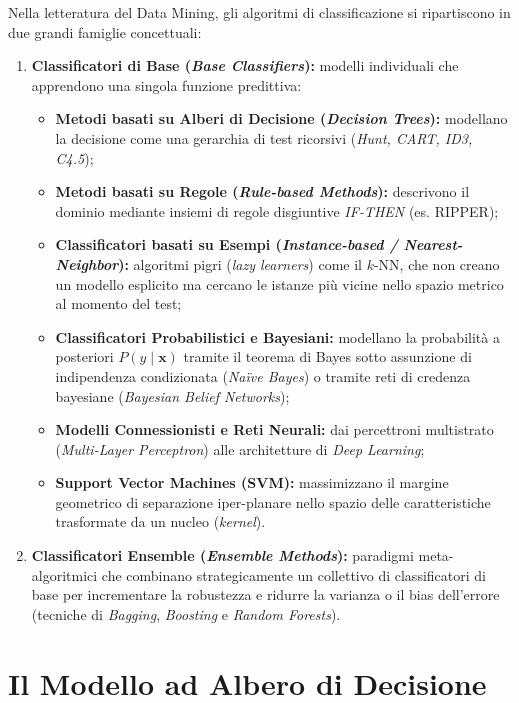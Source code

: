 Nella letteratura del Data Mining, gli algoritmi di classificazione si ripartiscono in due grandi famiglie concettuali:
\begin{enumerate}
    \item \textbf{Classificatori di Base (\textit{Base Classifiers}):} modelli individuali che apprendono una singola funzione predittiva:
    \begin{itemize}
        \item \textbf{Metodi basati su Alberi di Decisione (\textit{Decision Trees}):} modellano la decisione come una gerarchia di test ricorsivi (\textit{Hunt, CART, ID3, C4.5});
        \item \textbf{Metodi basati su Regole (\textit{Rule-based Methods}):} descrivono il dominio mediante insiemi di regole disgiuntive \textit{IF-THEN} (es. RIPPER);
        \item \textbf{Classificatori basati su Esempi (\textit{Instance-based / Nearest-Neighbor}):} algoritmi pigri (\textit{lazy learners}) come il $k$-NN, che non creano un modello esplicito ma cercano le istanze più vicine nello spazio metrico al momento del test;
        \item \textbf{Classificatori Probabilistici e Bayesiani:} modellano la probabilità a posteriori $P(y \mid \mathbf{x})$ tramite il teorema di Bayes sotto assunzione di indipendenza condizionata (\textit{Naïve Bayes}) o tramite reti di credenza bayesiane (\textit{Bayesian Belief Networks});
        \item \textbf{Modelli Connessionisti e Reti Neurali:} dai percettroni multistrato (\textit{Multi-Layer Perceptron}) alle architetture di \textit{Deep Learning};
        \item \textbf{Support Vector Machines (SVM):} massimizzano il margine geometrico di separazione iper-planare nello spazio delle caratteristiche trasformate da un nucleo (\textit{kernel}).
    \end{itemize}
    \item \textbf{Classificatori Ensemble (\textit{Ensemble Methods}):} paradigmi meta-algoritmici che combinano strategicamente un collettivo di classificatori di base per incrementare la robustezza e ridurre la varianza o il bias dell'errore (tecniche di \textit{Bagging}, \textit{Boosting} e \textit{Random Forests}).
\end{enumerate}

\FloatBarrier
\section{Il Modello ad Albero di Decisione}
\label{sec:dm-decision-tree-model}

